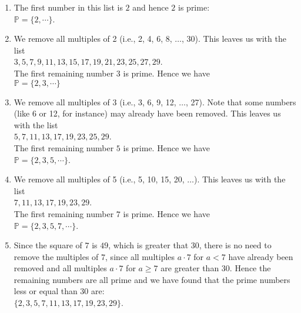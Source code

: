 \documentclass[11pt]{report}
\begin{document}
\begin{enumerate}
\item The first number in this list is $2$ and hence $2$ is prime:
      \\[0.2cm]
      \hspace*{1.3cm}
      $\mathbb{P} = \{ 2, \cdots \}$.
\item We remove all multiples of 2 (i.e., 2, 4, 6, 8, \(\ldots\), 30).  This leaves us with the list
      \\[0.2cm]
      \hspace*{1.3cm}
      $3, 5, 7, 9, 11, 13, 15, 17, 19, 21, 23, 25, 27, 29$.
      \\[0.2cm]
      The first remaining number $3$ is prime.  Hence we have
      \\[0.2cm]
      \hspace*{1.3cm}
      $\mathbb{P} = \{ 2, 3, \cdots \}$
\item We remove all multiples of 3 (i.e., 3, 6, 9, 12, \(\ldots\), 27).  Note that some numbers (like 6 or 12,
      for instance) may already have been removed.  This leaves us with the list
      \\[0.2cm]
      \hspace*{1.3cm}
      $5, 7, 11, 13, 17, 19, 23, 25, 29$.
      \\[0.2cm]
      The first remaining number $5$ is prime. Hence we have
      \\[0.2cm]
      \hspace*{1.3cm}
      $\mathbb{P} = \{ 2, 3, 5, \cdots \}$.
\item We remove all multiples of 5 (i.e., 5, 10, 15, 20, \(\ldots\)). This leaves us with the list
      \\[0.2cm]
      \hspace*{1.3cm}
      $7, 11, 13, 17, 19, 23, 29$.
      \\[0.2cm]
      The first remaining number $7$ is prime. Hence we have
      \\[0.2cm]
      \hspace*{1.3cm}
      $\mathbb{P} = \{ 2, 3, 5, 7, \cdots \}$.
\item Since the square of $7$ is $49$, which is greater that 30, there is no need to remove the multiples of
      $7$,  since all multiples $a \cdot 7$ for $a < 7$ have already been removed and all multiples $a \cdot 7$
      for $a \geq 7$ are greater than 30. Hence the remaining numbers are all prime and we have found that the
      prime numbers less or equal than 30 are: 
      \\[0.2cm]
      \hspace*{1.3cm}
      $\{ 2, 3, 5, 7, 11, 13, 17, 19, 23, 29\}$. 
\end{enumerate}
\end{document}
